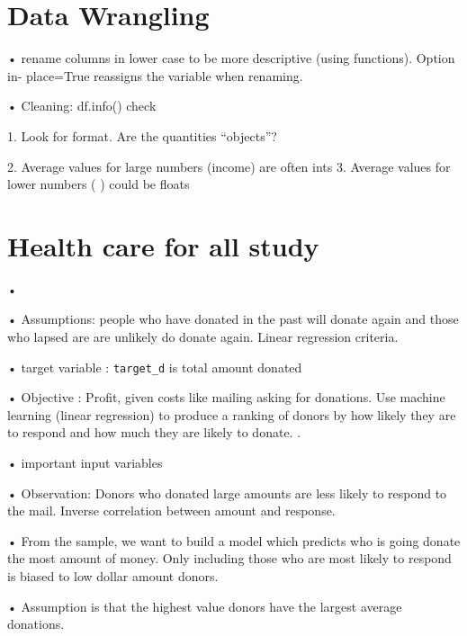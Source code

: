 \documentclass[11pt, oneside]{article}   	%
\newcommand{\code}[1]{\colorbox{light-gray}{\texttt{#1}}}
\def\code#1{\texttt{#1}}
\begin{document}
\section{Data Wrangling}

• rename columns in lower case to be more descriptive (using functions). Option in- place=True reassigns the variable when renaming.  \newline

• Cleaning: df.info() check  \newline

1. Look for format. Are the quantities “objects”?  \newline

2. Average values for large numbers (income) are often ints 3. Average values for lower numbers ( ) could be floats  \newline

\section{Health care for all study}
• {} \newline 
 
• Assumptions: people who have donated in the past will donate again and those who lapsed
 are are unlikely do donate again. Linear regression criteria. 
  \newline
 
• target variable : \code{target\_d} is total amount donated  \newline

• Objective : Profit, given costs like mailing asking for donations. Use machine learning (linear regression) to produce a ranking of donors by how likely they are to respond and how much they are likely to donate.
.\newline
 
• important input variables 
 
• Observation: Donors who donated large amounts are less likely to respond to the mail. 
Inverse correlation between amount and response.  \newline

• From the sample, we want to build a model which predicts who is going donate the most amount of money. Only including those who are most likely to respond is biased to low dollar amount donors.  \newline



• Assumption is that the highest value donors have the largest average donations.  \newline
\end{document}
